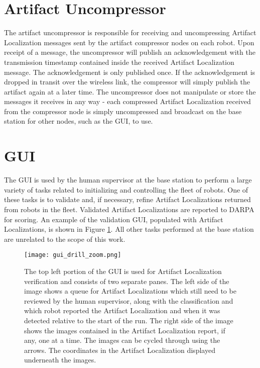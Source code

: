 \section{Artifact Uncompressor}

The artifact uncompressor is responsible for receiving and uncompressing Artifact Localization messages sent by the artifact compressor nodes on each robot. Upon receipt of a message, the uncompressor will publish an acknowledgement with the transmission timestamp contained inside the received Artifact Localization message. The acknowledgement is only published once. If the acknowledgement is dropped in transit over the wireless link, the compressor will simply publish the artifact again at a later time. The uncompressor does not manipulate or store the messages it receives in any way - each compressed Artifact Localization received from the compressor node is simply uncompressed and broadcast on the base station for other nodes, such as the GUI, to use.

\section{GUI}

The GUI is used by the human supervisor at the base station to perform a large variety of tasks related to initializing and controlling the fleet of robots. One of these tasks is to validate and, if necessary, refine Artifact Localizations returned from robots in the fleet. Validated Artifact Localizations are reported to DARPA for scoring. An example of the validation GUI, populated with Artifact Localizations, is shown in Figure \ref{gui}. All other tasks performed at the base station are unrelated to the scope of this work.

\begin{figure}
	\centering
	\texttt{[image: gui\_drill\_zoom.png]}
	\caption[GUI used for artifact localization validation]{The top left portion of the GUI is used for Artifact Localization verification and consists of two separate panes. The left side of the image shows a queue for Artifact Localizations which still need to be reviewed by the human supervisor, along with the classification and which robot reported the Artifact Localization and when it was detected relative to the start of the run. The right side of the image shows the images contained in the Artifact Localization report, if any, one at a time. The images can be cycled through using the arrows. The coordinates in the Artifact Localization displayed underneath the images.}
	\label{gui}
\end{figure}

